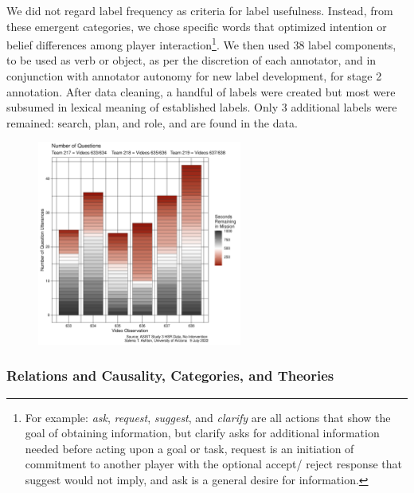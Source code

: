 \documentclass[10pt]{article}
\begin{document}
We did not regard label frequency as criteria for label usefulness. Instead, from these emergent categories, we chose specific words that optimized intention or belief differences among player interaction\footnote{For example: \emph{ask}, \emph{request}, \emph{suggest}, and \emph{clarify} are all actions that show the goal of obtaining information, but clarify asks for additional information needed before acting upon a goal or task, request is an initiation of commitment to another player with the optional accept/ reject response that suggest would not imply, and ask is a general desire for information.}. We then used 38 label components, to be used as verb or object, as per the discretion of each annotator, and in conjunction with annotator autonomy for new label development, for stage 2 annotation. After data cleaning, a handful of labels were created but most were subsumed in lexical meaning of established labels. Only 3 additional labels were remained: search, plan, and role, and are found in the data.


\begin{figure}[h!]
    \centering
    \includegraphics[width=0.6\textwidth]{../figures/QuestionTiming_STA.pdf}
    \caption{ }
\end{figure}

\clearpage












\subsubsection{Relations and Causality, Categories, and Theories}
\end{document}
